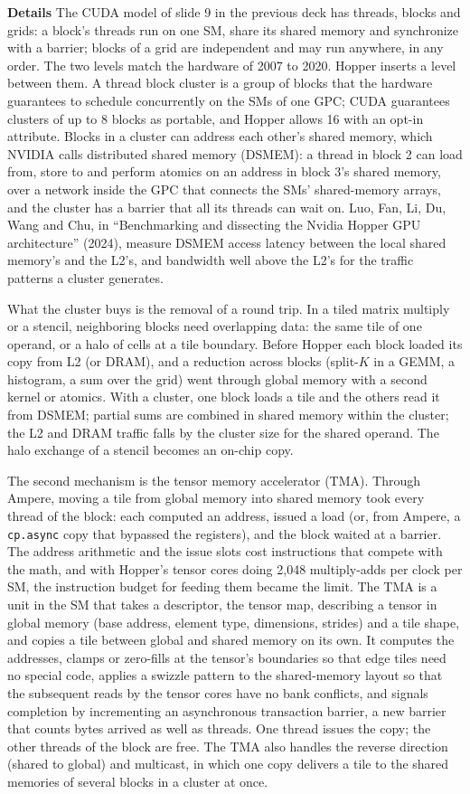 \documentclass[11pt,letterpaper]{article}
\newcommand{\para}[1]{\medskip\noindent\textbf{#1}\quad}
\begin{document}
\para{Details} The CUDA model of slide 9 in the previous deck has threads, blocks and grids: a block's threads run on one SM, share its shared memory and synchronize with a barrier; blocks of a grid are independent and may run anywhere, in any order. The two levels match the hardware of 2007 to 2020. Hopper inserts a level between them. A thread block cluster is a group of blocks that the hardware guarantees to schedule concurrently on the SMs of one GPC; CUDA guarantees clusters of up to 8 blocks as portable, and Hopper allows 16 with an opt-in attribute. Blocks in a cluster can address each other's shared memory, which NVIDIA calls distributed shared memory (DSMEM): a thread in block 2 can load from, store to and perform atomics on an address in block 3's shared memory, over a network inside the GPC that connects the SMs' shared-memory arrays, and the cluster has a barrier that all its threads can wait on. Luo, Fan, Li, Du, Wang and Chu, in ``Benchmarking and dissecting the Nvidia Hopper GPU architecture'' (2024), measure DSMEM access latency between the local shared memory's and the L2's, and bandwidth well above the L2's for the traffic patterns a cluster generates.

What the cluster buys is the removal of a round trip. In a tiled matrix multiply or a stencil, neighboring blocks need overlapping data: the same tile of one operand, or a halo of cells at a tile boundary. Before Hopper each block loaded its copy from L2 (or DRAM), and a reduction across blocks (split-$K$ in a GEMM, a histogram, a sum over the grid) went through global memory with a second kernel or atomics. With a cluster, one block loads a tile and the others read it from DSMEM; partial sums are combined in shared memory within the cluster; the L2 and DRAM traffic falls by the cluster size for the shared operand. The halo exchange of a stencil becomes an on-chip copy.

The second mechanism is the tensor memory accelerator (TMA). Through Ampere, moving a tile from global memory into shared memory took every thread of the block: each computed an address, issued a load (or, from Ampere, a \texttt{cp.async} copy that bypassed the registers), and the block waited at a barrier. The address arithmetic and the issue slots cost instructions that compete with the math, and with Hopper's tensor cores doing 2{,}048 multiply-adds per clock per SM, the instruction budget for feeding them became the limit. The TMA is a unit in the SM that takes a descriptor, the tensor map, describing a tensor in global memory (base address, element type, dimensions, strides) and a tile shape, and copies a tile between global and shared memory on its own. It computes the addresses, clamps or zero-fills at the tensor's boundaries so that edge tiles need no special code, applies a swizzle pattern to the shared-memory layout so that the subsequent reads by the tensor cores have no bank conflicts, and signals completion by incrementing an asynchronous transaction barrier, a new barrier that counts bytes arrived as well as threads. One thread issues the copy; the other threads of the block are free. The TMA also handles the reverse direction (shared to global) and multicast, in which one copy delivers a tile to the shared memories of several blocks in a cluster at once.
\end{document}
